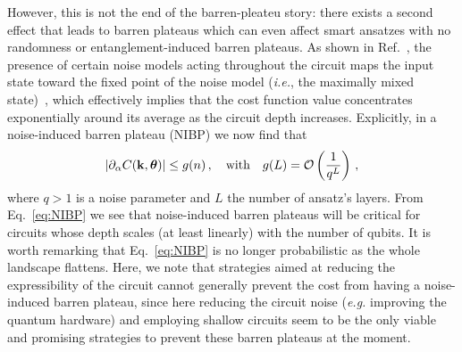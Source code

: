 However, this is not the end of the barren-pleateu story: there exists a second effect that leads to barren plateaus which can even affect smart ansatzes with no randomness or entanglement-induced barren plateaus. As shown in Ref.~\cite{wang2020noise}, the presence of certain noise models acting throughout the circuit maps the input state toward the fixed point of the noise model (\textit{i.e.}, the maximally mixed state)~\cite{wang2020noise,franca2020limitations}, which effectively implies that the cost function value concentrates exponentially around its average as the circuit depth increases. Explicitly, in a noise-induced barren plateau (NIBP) we now find that
\begin{equation}\label{eq:NIBP}
    \left|\partial _{\alpha} C(\mathbf{k},\bm{\theta})\right|\leq g(n)\,, \quad \text{with} \quad g(L)= \mathcal{O}\left(\frac{1}{q^L}\right)\,,
\end{equation}
where $q>1$ is a noise parameter and $L$ the number of ansatz's layers. From Eq.~\ref{eq:NIBP} we see that noise-induced barren plateaus will be critical for circuits whose depth scales (at least linearly) with the number of qubits. It is worth remarking that Eq.~\ref{eq:NIBP} is no longer probabilistic as the whole landscape flattens. Here, we note that strategies aimed at reducing the expressibility of the circuit cannot generally prevent the cost from having a noise-induced barren plateau, since here reducing the circuit noise (\textit{e.g.} improving the quantum hardware) and employing shallow circuits seem to be the only viable and promising strategies to prevent these barren plateaus at the moment.
